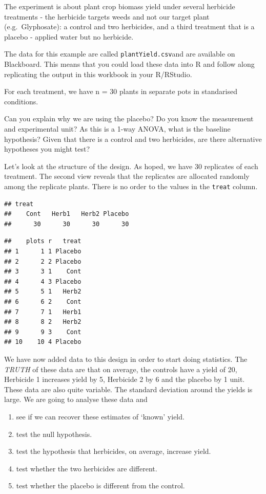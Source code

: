 \documentclass[
]{book}
\providecommand{\tightlist}{%
  \setlength{\itemsep}{0pt}\setlength{\parskip}{0pt}}
\begin{document}
The experiment is about plant crop biomass yield under several herbicide treatments - the herbicide targets weeds and not our target plant (e.g.~Glyphosate): a control and two herbicides, and a third treatment that is a placebo - applied water but no herbicide.

The data for this example are called \texttt{plantYield.csv}and are available on Blackboard. This means that you could load these data into R and follow along replicating the output in this workbook in your R/RStudio.

For each treatment, we have n = 30 plants in separate pots in standarised conditions.

Can you explain why we are using the placebo? Do you know the measurement and experimental unit? As this is a 1-way ANOVA, what is the baseline hypothesis? Given that there is a control and two herbicides, are there alternative hypotheses you might test?

Let's look at the structure of the design. As hoped, we have 30 replicates of each treatment. The second view reveals that the replicates are allocated randomly among the replicate plants. There is no order to the values in the \texttt{treat} column.

\begin{verbatim}
## treat
##    Cont   Herb1   Herb2 Placebo 
##      30      30      30      30
\end{verbatim}

\begin{verbatim}
##    plots r   treat
## 1      1 1 Placebo
## 2      2 2 Placebo
## 3      3 1    Cont
## 4      4 3 Placebo
## 5      5 1   Herb2
## 6      6 2    Cont
## 7      7 1   Herb1
## 8      8 2   Herb2
## 9      9 3    Cont
## 10    10 4 Placebo
\end{verbatim}

We have now added data to this design in order to start doing statistics. The \emph{TRUTH} of these data are that on average, the controls have a yield of 20, Herbicide 1 increases yield by 5, Herbicide 2 by 6 and the placebo by 1 unit. These data are also quite variable. The standard deviation around the yields is large. We are going to analyse these data and

\begin{enumerate}
\def\labelenumi{\arabic{enumi}.}
\tightlist
\item
  see if we can recover these estimates of `known' yield.
\item
  test the null hypothesis.
\item
  test the hypothesis that herbicides, on average, increase yield.
\item
  test whether the two herbicides are different.
\item
  test whether the placebo is different from the control.
\end{enumerate}
\end{document}
